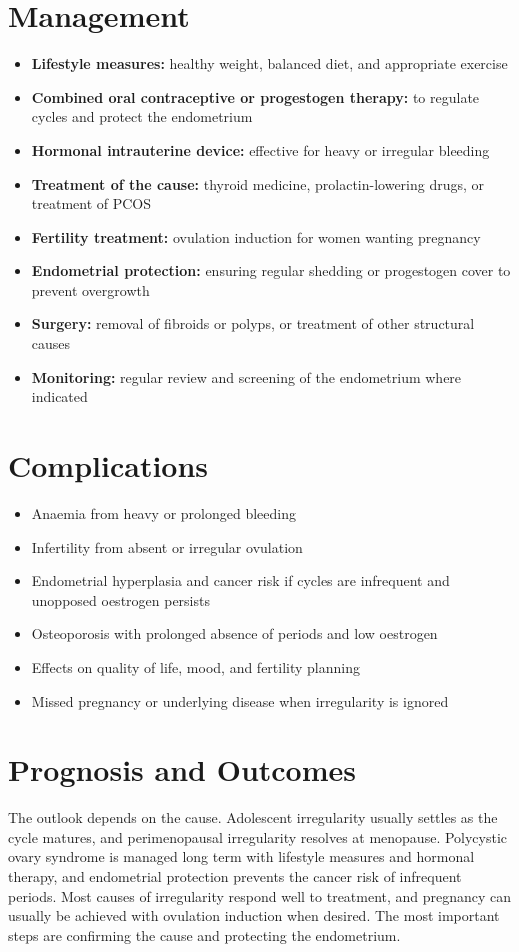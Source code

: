 \section*{Management}
\begin{itemize}
    \item \textbf{Lifestyle measures:} healthy weight, balanced diet, and appropriate exercise
    \item \textbf{Combined oral contraceptive or progestogen therapy:} to regulate cycles and protect the endometrium
    \item \textbf{Hormonal intrauterine device:} effective for heavy or irregular bleeding
    \item \textbf{Treatment of the cause:} thyroid medicine, prolactin-lowering drugs, or treatment of PCOS
    \item \textbf{Fertility treatment:} ovulation induction for women wanting pregnancy
    \item \textbf{Endometrial protection:} ensuring regular shedding or progestogen cover to prevent overgrowth
    \item \textbf{Surgery:} removal of fibroids or polyps, or treatment of other structural causes
    \item \textbf{Monitoring:} regular review and screening of the endometrium where indicated
\end{itemize}

\section*{Complications}
\begin{itemize}
    \item Anaemia from heavy or prolonged bleeding
    \item Infertility from absent or irregular ovulation
    \item Endometrial hyperplasia and cancer risk if cycles are infrequent and unopposed oestrogen persists
    \item Osteoporosis with prolonged absence of periods and low oestrogen
    \item Effects on quality of life, mood, and fertility planning
    \item Missed pregnancy or underlying disease when irregularity is ignored
\end{itemize}

\section*{Prognosis and Outcomes}
The outlook depends on the cause. Adolescent irregularity usually settles as the cycle matures, and perimenopausal irregularity resolves at menopause. Polycystic ovary syndrome is managed long term with lifestyle measures and hormonal therapy, and endometrial protection prevents the cancer risk of infrequent periods. Most causes of irregularity respond well to treatment, and pregnancy can usually be achieved with ovulation induction when desired. The most important steps are confirming the cause and protecting the endometrium.

